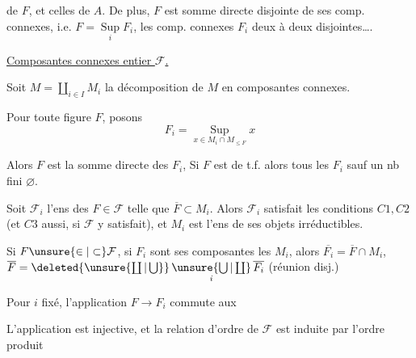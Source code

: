 de $F$, et celles de $A$. De plus, $F$ est somme directe disjointe de ses comp. connexes, i.e. $F=\mathop{\mathrm{Sup}}\limits_i F_i$, les comp. connexes $F_i$ deux à deux disjointes\ldots .


\uline{Composantes connexes   entier $\mathcal F$.}

Soit $M=\coprod_{i\in I}M_i$ la décomposition de $M$ en composantes connexes.

Pour toute figure $F$, posons
\[
F_i=\mathop{\mathrm{Sup}}\limits_{x\in M_i\cap M_{\leq F}}x
\]

Alors $F$ est la somme directe des $F_i$,  Si $F$ est de t.f.  alors tous les $F_i$ sauf un nb fini  $\varnothing$.

 Soit $\mathcal F_i$ l'ens des $F\in\mathcal F$ telle que $\overline F\subset M_i$. Alors  $\mathcal F_i$ satisfait les conditions $C1,C2$ (et $C3$ aussi, si $\mathcal F$ y satisfait), et $M_i$ est l'ens de ses objets irréductibles.

Si $F\unsure{\in|\subset}\mathcal F$, si $F_i$ sont ses composantes  les $M_i$, alors $\overline{F_i}=\overline F\cap M_i$, $\overline F=\deleted{\unsure{\coprod|\bigcup}}\mathop{\unsure{\bigcup|\coprod}}\limits_i\overline{F_i}$ (réunion disj.)

Pour $i$ fixé, l'application $F\longrightarrow F_i$ commute aux 

L'application
est injective, et la relation d'ordre de $\mathcal F$ est induite par l'ordre produit
